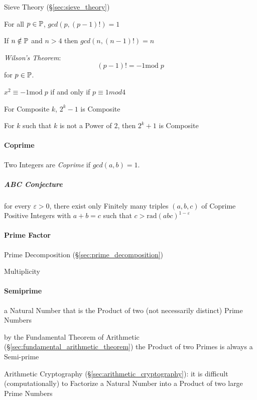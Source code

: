 Sieve Theory (\S\ref{sec:sieve_theory})

For all $p \in \mathbb{P}$, $gcd(p, (p-1)!) = 1$

If $n \notin \mathbb{P}$ and $n > 4$ then $gcd(n,(n-1)!) = n$

\emph{Wilson's Theorem}:
\[
  (p - 1)! = -1 \mathrm{mod}\;p
\]
for $p \in \mathbb{P}$.

$x^2 \equiv -1 \mathrm{mod}\;p$ if and only if $p \equiv 1 mod 4$

For Composite $k$, $2^k-1$ is Composite

For $k$ such that $k$ is not a Power of $2$, then $2^k+1$ is Composite



\paragraph{Coprime}\label{sec:coprime}\hfill

Two Integers are \emph{Coprime} if $gcd (a,b) = 1$.



\subparagraph{ABC Conjecture}\label{sec:abc_conjecture}\hfill

for every $\varepsilon > 0$, there exist only Finitely many triples $(a,b,c)$ of
Coprime Positive Integers with $a + b = c$ such that
$c > \mathrm{rad}(abc)^{1-\varepsilon}$



\paragraph{Prime Factor}\label{sec:prime_factor}\hfill

Prime Decomposition (\S\ref{sec:prime_decomposition})

Multiplicity



\paragraph{Semiprime}\label{sec:semiprime}\hfill

a Natural Number that is the Product of two (not necessarily distinct) Prime
Numbers

by the Fundamental Theorem of Arithmetic
(\S\ref{sec:fundamental_arithmetic_theorem}) the Product of two Primes is
always a Semi-prime

\fist Arithmetic Cryptography (\S\ref{sec:arithmetic_cryptography}): it is
difficult (computationally) to Factorize a Natural Number into a Product of two
large Prime Numbers



